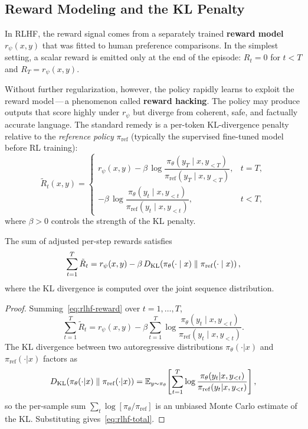 \subsection{Reward Modeling and the KL Penalty}

In RLHF, the reward signal comes from a separately trained
\textbf{reward model} $r_\psi(x, y)$ that was fitted
to human preference comparisons.  In the simplest setting, a scalar reward
is emitted only at the end of the episode:
$R_t = 0$ for $t < T$ and $R_T = r_\psi(x, y)$.

Without further regularization, however, the policy rapidly learns to
exploit the reward model\,---\,a phenomenon called
\textbf{reward hacking}.  The policy may produce
outputs that score highly under $r_\psi$ but diverge from coherent, safe,
and factually accurate language.  The standard remedy is a per-token
KL-divergence penalty relative to the
\emph{reference policy} $\pi_{\mathrm{ref}}$
(typically the supervised fine-tuned model before RL training):
\begin{equation}
\label{eq:rlhf-reward}
\tilde{R}_t(x, y)
=
\begin{cases}
r_\psi(x, y)
  - \beta\,\log\dfrac{\pi_\theta(y_T \mid x, y_{<T})}
                      {\pi_{\mathrm{ref}}(y_T \mid x, y_{<T})},
& t = T, \\[8pt]
- \beta\,\log\dfrac{\pi_\theta(y_t \mid x, y_{<t})}
                    {\pi_{\mathrm{ref}}(y_t \mid x, y_{<t})},
& t < T,
\end{cases}
\end{equation}
where $\beta > 0$ controls the strength of the KL penalty.

\begin{proposition}
\label{prop:rlhf-kl}
The sum of adjusted per-step rewards satisfies
\begin{equation}
\label{eq:rlhf-total}
\sum_{t=1}^T \tilde{R}_t
= r_\psi(x, y)
  - \beta\,D_{\mathrm{KL}}\!\left(\pi_\theta(\cdot \mid x)\;\|\;\pi_{\mathrm{ref}}(\cdot \mid x)\right),
\end{equation}
where the KL divergence is computed over the joint sequence distribution.
\end{proposition}

\begin{proof}
Summing~\eqref{eq:rlhf-reward} over $t = 1, \ldots, T$,
\[
\sum_{t=1}^T \tilde{R}_t
= r_\psi(x,y)
  - \beta\sum_{t=1}^T
    \log\frac{\pi_\theta(y_t \mid x, y_{<t})}
             {\pi_{\mathrm{ref}}(y_t \mid x, y_{<t})}.
\]
The KL divergence between two autoregressive distributions
$\pi_\theta(\cdot|x)$ and $\pi_{\mathrm{ref}}(\cdot|x)$ factors as
\[
D_{\mathrm{KL}}\!\left(\pi_\theta(\cdot|x)\;\|\;\pi_{\mathrm{ref}}(\cdot|x)\right)
= \operatorname{\mathbb{E}}_{y \sim \pi_\theta}\!\left[
  \sum_{t=1}^T \log\frac{\pi_\theta(y_t|x,y_{<t})}
                         {\pi_{\mathrm{ref}}(y_t|x,y_{<t})}
\right],
\]
so the per-sample sum $\sum_t \log[\pi_\theta/\pi_{\mathrm{ref}}]$ is an
unbiased Monte Carlo estimate of the KL.  Substituting gives~\eqref{eq:rlhf-total}.
\end{proof}


